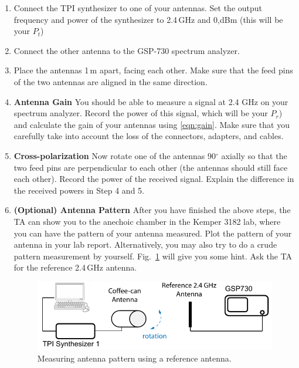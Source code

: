\documentclass[letterpaper, 11pt]{article}
\begin{document}
\begin{enumerate}
	\item Connect the TPI synthesizer to one of your antennas. Set the output frequency and power of the synthesizer to 2.4\,GHz and 0,dBm (this will be your $P_t$)
		
	\item Connect the other antenna to the GSP-730 spectrum analyzer. 
	
	\item Place the antennas 1\,m apart, facing each other. Make sure that the feed pins of the two antennas are aligned in the same direction. 
	
	\item \textbf{Antenna Gain}	You should be able to measure a signal at 2.4 GHz on your spectrum analyzer. Record the power of this signal, which will be your $P_r$) and calculate the gain of your antennas using \eqref{eqn:gain}. Make sure that you carefully take into account the loss of the connectors, adapters, and cables. 
	
	\item \textbf{Cross-polarization} Now rotate one of the antennas 90$^\circ$ axially so that the two feed pins are perpendicular to each other  (the antennas should still face each other). Record the power of the received signal. Explain the difference in the received powers in Step 4 and 5. 
	
	\item \textbf{(Optional) Antenna Pattern } After you have finished the above steps, the TA can show you to the anechoic chamber in the Kemper 3182 lab, where you can have the pattern of your antenna measured. Plot the pattern of your antenna in your lab report. Alternatively, you may also try to do a crude pattern measurement by yourself. Fig.~\ref{fig:pattern_measure} will give you some hint. Ask the TA for the reference 2.4\,GHz antenna. 
		\begin{figure}[ht]
			\centering	
			\includegraphics[width=4.5in]{pattern_measure}
			\caption{Measuring antenna pattern using a reference antenna.}
			\label{fig:pattern_measure}
		\end{figure}
\end{enumerate}
%
% 
%
%
%
\end{document}
